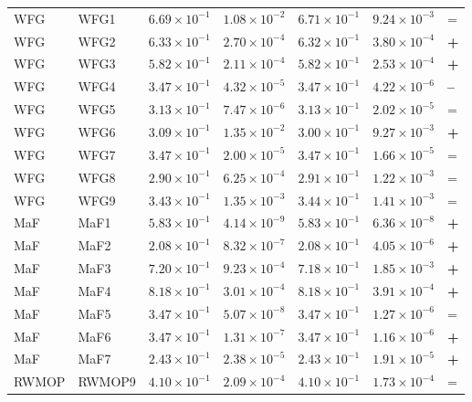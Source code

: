 \begin{table}[t]
\begin{tabular}{llrrrrl}
\addlinespace
WFG & WFG1 & $6.69\!\times\!10^{-1}$ & $1.08\!\times\!10^{-2}$ & $6.71\!\times\!10^{-1}$ & $9.24\!\times\!10^{-3}$ & = \\
WFG & WFG2 & $6.33\!\times\!10^{-1}$ & $2.70\!\times\!10^{-4}$ & $6.32\!\times\!10^{-1}$ & $3.80\!\times\!10^{-4}$ & \textbf{+} \\
WFG & WFG3 & $5.82\!\times\!10^{-1}$ & $2.11\!\times\!10^{-4}$ & $5.82\!\times\!10^{-1}$ & $2.53\!\times\!10^{-4}$ & \textbf{+} \\
WFG & WFG4 & $3.47\!\times\!10^{-1}$ & $4.32\!\times\!10^{-5}$ & $3.47\!\times\!10^{-1}$ & $4.22\!\times\!10^{-6}$ & \textbf{--} \\
WFG & WFG5 & $3.13\!\times\!10^{-1}$ & $7.47\!\times\!10^{-6}$ & $3.13\!\times\!10^{-1}$ & $2.02\!\times\!10^{-5}$ & = \\
WFG & WFG6 & $3.09\!\times\!10^{-1}$ & $1.35\!\times\!10^{-2}$ & $3.00\!\times\!10^{-1}$ & $9.27\!\times\!10^{-3}$ & \textbf{+} \\
WFG & WFG7 & $3.47\!\times\!10^{-1}$ & $2.00\!\times\!10^{-5}$ & $3.47\!\times\!10^{-1}$ & $1.66\!\times\!10^{-5}$ & = \\
WFG & WFG8 & $2.90\!\times\!10^{-1}$ & $6.25\!\times\!10^{-4}$ & $2.91\!\times\!10^{-1}$ & $1.22\!\times\!10^{-3}$ & = \\
WFG & WFG9 & $3.43\!\times\!10^{-1}$ & $1.35\!\times\!10^{-3}$ & $3.44\!\times\!10^{-1}$ & $1.41\!\times\!10^{-3}$ & = \\
\addlinespace
MaF & MaF1 & $5.83\!\times\!10^{-1}$ & $4.14\!\times\!10^{-9}$ & $5.83\!\times\!10^{-1}$ & $6.36\!\times\!10^{-8}$ & \textbf{+} \\
MaF & MaF2 & $2.08\!\times\!10^{-1}$ & $8.32\!\times\!10^{-7}$ & $2.08\!\times\!10^{-1}$ & $4.05\!\times\!10^{-6}$ & \textbf{+} \\
MaF & MaF3 & $7.20\!\times\!10^{-1}$ & $9.23\!\times\!10^{-4}$ & $7.18\!\times\!10^{-1}$ & $1.85\!\times\!10^{-3}$ & \textbf{+} \\
MaF & MaF4 & $8.18\!\times\!10^{-1}$ & $3.01\!\times\!10^{-4}$ & $8.18\!\times\!10^{-1}$ & $3.91\!\times\!10^{-4}$ & \textbf{+} \\
MaF & MaF5 & $3.47\!\times\!10^{-1}$ & $5.07\!\times\!10^{-8}$ & $3.47\!\times\!10^{-1}$ & $1.27\!\times\!10^{-6}$ & = \\
MaF & MaF6 & $3.47\!\times\!10^{-1}$ & $1.31\!\times\!10^{-7}$ & $3.47\!\times\!10^{-1}$ & $1.16\!\times\!10^{-6}$ & \textbf{+} \\
MaF & MaF7 & $2.43\!\times\!10^{-1}$ & $2.38\!\times\!10^{-5}$ & $2.43\!\times\!10^{-1}$ & $1.91\!\times\!10^{-5}$ & \textbf{+} \\
\addlinespace
RWMOP & RWMOP9 & $4.10\!\times\!10^{-1}$ & $2.09\!\times\!10^{-4}$ & $4.10\!\times\!10^{-1}$ & $1.73\!\times\!10^{-4}$ & = \\
\bottomrule
\end{tabular}
\end{table}
